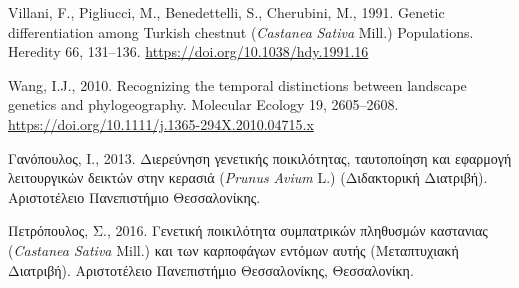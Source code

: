 \documentclass[12pt,a4paper,]{report}
\begin{document}
\leavevmode\hypertarget{ref-Villani1991}{}%
Villani, F., Pigliucci, M., Benedettelli, S., Cherubini, M., 1991.
Genetic differentiation among Turkish chestnut (\emph{Castanea}
\emph{Sativa} Mill.) Populations. Heredity 66, 131--136.
\url{https://doi.org/10.1038/hdy.1991.16}

\leavevmode\hypertarget{ref-Wang2010a}{}%
Wang, I.J., 2010. Recognizing the temporal distinctions between
landscape genetics and phylogeography. Molecular Ecology 19, 2605--2608.
\url{https://doi.org/10.1111/j.1365-294X.2010.04715.x}

\leavevmode\hypertarget{ref-__2013}{}%
Γανόπουλος, Ι., 2013. Διερεύνηση γενετικής ποικιλότητας, ταυτοποίηση και
εφαρμογή λειτουργικών δεικτών στην κερασιά (\emph{Prunus} \emph{Avium}
L.) (Διδακτορική Διατριβή). Αριστοτέλειο Πανεπιστήμιο Θεσσαλονίκης.

\leavevmode\hypertarget{ref-2016a}{}%
Πετρόπουλος, Σ., 2016. Γενετική ποικιλότητα συμπατρικών πληθυσμών
καστανιας (\emph{Castanea Sativa} Mill.) και των καρποφάγων εντόμων
αυτής (Mεταπτυχιακή Διατριβή). Αριστοτέλειο Πανεπιστήμιο Θεσσαλονίκης,
Θεσσαλονίκη.
\end{document}
